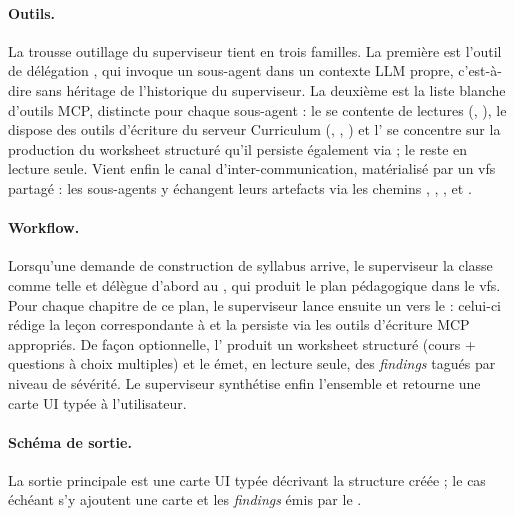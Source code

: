 \paragraph{Outils.} La trousse outillage du superviseur tient en
trois familles. La première est l'outil de délégation
, qui invoque un sous-agent dans un
contexte \textsc{LLM} propre, c'est-à-dire sans héritage de
l'historique du superviseur. La deuxième est la liste blanche d'outils
MCP, distincte pour chaque sous-agent : le 
se contente de lectures (, ),
le  dispose des outils d'écriture du serveur Curriculum
(, ,
) et l' se concentre sur
la production du worksheet structuré qu'il persiste également via
 ; le  reste
en lecture seule. Vient enfin le canal d'inter-communication,
matérialisé par un \gls{vfs} partagé : les sous-agents y échangent
leurs artefacts via les chemins ,
, ,
 et .

\paragraph{Workflow.}
Lorsqu'une demande de construction de syllabus arrive, le superviseur
la classe comme telle et délègue d'abord au ,
qui produit le plan pédagogique  dans le
\gls{vfs}. Pour chaque chapitre de ce plan, le superviseur lance
ensuite un  vers le  : celui-ci rédige
la leçon correspondante à  et la persiste
via les outils d'écriture MCP appropriés. De façon optionnelle,
l' produit un worksheet structuré (cours +
questions à choix multiples) et le  émet,
en lecture seule, des \emph{findings} tagués par niveau de sévérité.
Le superviseur synthétise enfin l'ensemble et retourne une carte UI
typée  à l'utilisateur.

\paragraph{Schéma de sortie.} La sortie principale est une carte UI
typée  décrivant la structure
créée ; le cas échéant s'y ajoutent une carte
 et les \emph{findings}
émis par le .

